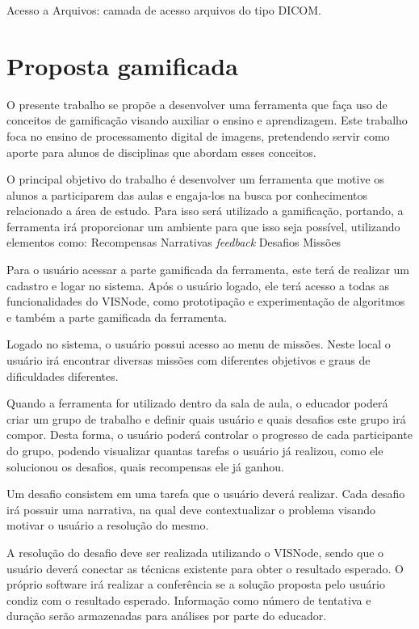 \documentclass[
	12pt,				%
	oneside,			%
	a4paper,			%
	english,			%
	french,				%
	spanish,			%
	brazil,				%
	]{abntex2}
\begin{document}
Acesso a Arquivos: camada de acesso arquivos do tipo DICOM\cite{reisferramenta}.

\section{Proposta gamificada}

O presente trabalho se propõe a desenvolver uma ferramenta que faça uso de conceitos de gamificação visando auxiliar o ensino e aprendizagem. Este trabalho foca no ensino de processamento digital de imagens, pretendendo servir como aporte para alunos de disciplinas que abordam esses conceitos.

O principal objetivo do trabalho é desenvolver um ferramenta que motive os alunos a participarem das aulas e engaja-los na busca por conhecimentos relacionado a área de estudo. Para isso será utilizado a gamificação, portando, a ferramenta irá proporcionar um ambiente para que isso seja possível, utilizando elementos como:
Recompensas
Narrativas
\textit{feedback}
Desafios
Missões

Para o usuário acessar a parte gamificada da ferramenta, este terá de realizar um cadastro e logar no sistema. Após o usuário logado, ele terá acesso a todas as funcionalidades do VISNode, como prototipação e experimentação de algoritmos e também a parte gamificada da ferramenta.

Logado no sistema, o usuário possui acesso ao menu de missões. Neste local o usuário irá encontrar diversas missões com diferentes objetivos e graus de dificuldades diferentes.	

Quando a ferramenta for utilizado dentro da sala de aula, o educador poderá criar um grupo de trabalho e definir quais usuário e quais desafios este grupo irá compor. Desta forma, o usuário poderá controlar o progresso de cada participante do grupo, podendo visualizar quantas tarefas o usuário já realizou, como ele solucionou os desafios, quais recompensas ele já ganhou.

Um desafio consistem em uma tarefa que o usuário deverá realizar. Cada desafio irá possuir uma narrativa, na qual deve contextualizar o problema visando motivar o usuário a resolução do mesmo.

A resolução do desafio deve ser realizada utilizando o VISNode, sendo que o usuário deverá conectar as técnicas existente para obter o resultado esperado. O próprio software irá realizar a conferência se a solução proposta pelo usuário condiz com o resultado esperado. Informação como número de tentativa e duração serão armazenadas para análises por parte do educador.
\end{document}
